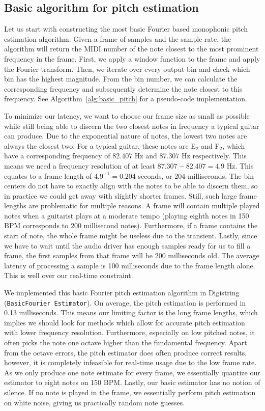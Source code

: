 \documentclass[a4paper,10pt,twocolumn]{article}
\newcommand{\note}[2]{#1${}_{#2}$}
\begin{document}
\subsection{Basic algorithm for pitch estimation}  \label{sec:basic}
Let us start with constructing the most basic Fourier based monophonic pitch estimation algorithm. Given a frame of samples and the sample rate, the algorithm will return the MIDI number of the note closest to the most prominent frequency in the frame. First, we apply a window function to the frame and apply the Fourier transform. Then, we iterate over every output bin and check which bin has the highest magnitude. From the bin number, we can calculate the corresponding frequency and subsequently determine the note closest to this frequency. See Algorithm~\ref{alg:basic_pitch} for a pseudo-code implementation.

To minimize our latency, we want to choose our frame size as small as possible while still being able to discern the two closest notes in frequency a typical guitar can produce. Due to the exponential nature of notes, the lowest two notes are always the closest two. For a typical guitar, these notes are \note{E}{2} and \note{F}{2}, which have a corresponding frequency of 82.407 Hz and 87.307 Hz respectively. This means we need a frequency resolution of at least $87.307 - 82.407 = 4.9$ Hz. This equates to a frame length of $4.9^{-1} = 0.204$ seconds, or 204 milliseconds. The bin centers do not have to exactly align with the notes to be able to discern them, so in practice we could get away with slightly shorter frames. Still, such large frame lengths are problematic for multiple reasons. A frame will contain multiple played notes when a guitarist plays at a moderate tempo (playing eighth notes in 150 BPM corresponds to 200 millisecond notes). Furthermore, if a frame contains the start of note, the whole frame might be useless due to the transient. Lastly, since we have to wait until the audio driver has enough samples ready for us to fill a frame, the first samples from that frame will be 200 milliseconds old. The average latency of processing a sample is 100 milliseconds due to the frame length alone. This is well over our real-time constraint.

We implemented this basic Fourier pitch estimation algorithm in Digistring (\texttt{BasicFourier Estimator}). On average, the pitch estimation is performed in 0.13 milliseconds. This means our limiting factor is the long frame lengths, which implies we should look for methods which allow for accurate pitch estimation with lower frequency resolution. Furthermore, especially on low pitched notes, it often picks the note one octave higher than the fundamental frequency. Apart from the octave errors, the pitch estimator does often produce correct results, however, it is completely infeasible for real-time usage due to the low frame rate. As we only produce one note estimate for every frame, we essentially quantize our estimator to eight notes on 150 BPM. Lastly, our basic estimator has no notion of silence. If no note is played in the frame, we essentially perform pitch estimation on white noise, giving us practically random note guesses.

\end{document}

